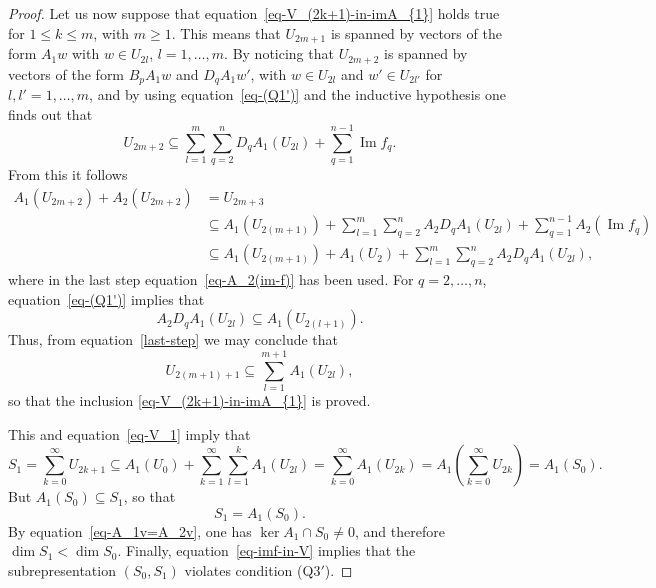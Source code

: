 \documentclass[11pt]{article}
\numberwithin{equation}{section}
\numberwithin{equation}{section}
\begin{document}
\begin{proof}
Let us now suppose that equation~\eqref{eq-V_(2k+1)-in-imA_{1}} holds true for $1\leq k \leq m$, with $m\geq 1$. This means that $U_{2m+1}$ is spanned by vectors of the form
$A_{1}w$ with $w\in U_{2l}$, $l=1,\dots,m$.
By noticing that $U_{2m+2}$ is spanned by vectors of the form $B_{p}A_{1}w$ and $D_{q}A_{1}w'$, with $w\in U_{2l}$ and $w'\in U_{2l'}$ for $l,l'=1,\dots,m$, and by using equation~\eqref{eq-(Q1')} and the inductive hypothesis one
finds out that
\begin{equation*}
U_{2m+2}\subseteq \sum_{l=1}^{m} \sum_{q=2}^{n}D_{q}A_{1}(U_{2l})+\sum_{q=1}^{n-1}\operatorname{Im} f_{q} .
\end{equation*}
From this it follows
\begin{align}
A_1(U_{2m+2}) + A_2(U_{2m+2}) &= U_{2m+3} \nonumber\\
& \subseteq A_{1}(U_{2(m+1)})+\sum_{l=1}^{m} \sum_{q=2}^{n}A_{2}D_{q}A_{1}(U_{2l}) +\sum_{q=1}^{n-1}A_{2}(\operatorname{Im} f_{q}) \nonumber\\
& \subseteq A_{1}(U_{2(m+1)})+A_{1}(U_{2})+\sum_{l=1}^{m} \sum_{q=2}^{n}A_{2}D_{q}A_{1}(U_{2l}) ,\label{last-step}
\end{align}
where in the last step equation~\eqref{eq-A_2(im-f)} has been used.
For $q=2,\dots, n$, equation~\eqref{eq-(Q1')} implies that
\begin{equation*}
A_{2}D_{q}A_{1}(U_{2l}) \subseteq A_{1}(U_{2(l+1)}) .
\end{equation*}
Thus, from equation~\eqref{last-step} we may conclude that
\begin{equation*}
U_{2(m+1)+1}\subseteq\sum_{l=1}^{m+1}A_{1}(U_{2l}) ,
\end{equation*}
so that the inclusion \eqref{eq-V_(2k+1)-in-imA_{1}} is proved.

This and equation~\eqref{eq-V_1} imply that
\begin{equation*}
S_{1}=\sum_{k=0}^{\infty}U_{2k+1}\subseteq A_{1}(U_{0})+\sum_{k=1}^{\infty}\sum_{l=1}^{k}A_{1}(U_{2l})=\sum_{k=0}^{\infty}A_{1}(U_{2k})= A_{1}\left(\sum_{k=0}^{\infty}U_{2k}\right)=A_{1}(S_{0}).
\end{equation*}
But $A_{1}(S_{0})\subseteq S_{1}$, so that
\begin{equation*}
S_{1}=A_{1}(S_{0}) .
\end{equation*}
By equation~\eqref{eq-A_1v=A_2v}, one has $\ker A_{1}\cap S_{0}\neq0$, and therefore $\dim S_{1}<\dim S_{0}$.
Finally, equation~\eqref{eq-imf-in-V} implies that the subrepresentation $(S_{0},S_{1})$ violates condition (Q$3'$).
 \end{proof}
\end{document}
